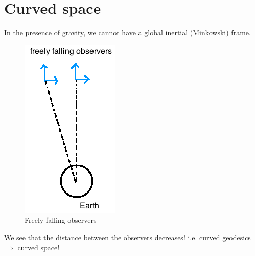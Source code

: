 \documentclass[a4paper]{article} %
\begin{document}
\section{Curved space}

In the presence of gravity, we cannot have a global inertial (Minkowski) frame.

\begin{figure}[h]
\centering
\includegraphics[height=0.2\textheight]{images/freely-falling-observers.png}
\caption{Freely falling observers}
\end{figure}
We see that the distance between the observers decreases! i.e. curved geodesics $\Rightarrow$ curved space!
\end{document}

